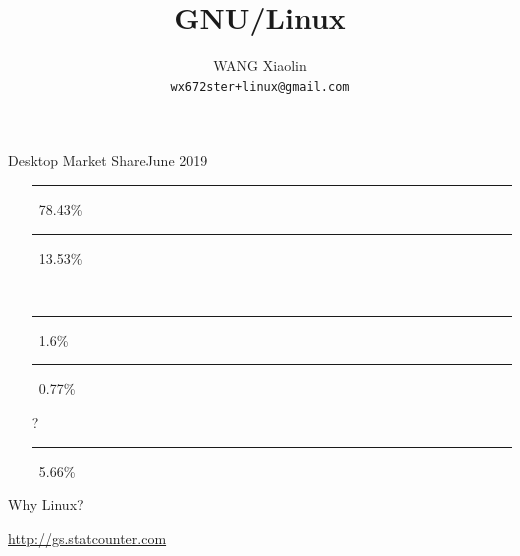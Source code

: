 \usepackage{worldflags}
\newcommand{\GG}{\textcolor{SkyBlue}{\nerd }}
\newcommand{\world}{\textcolor{SkyBlue}{\nerd 🌎}}%
\newcommand{\linux}{{\nerd }}
\newcommand{\openbook}{{\nerd }}

\title{GNU/Linux}

\author{WANG Xiaolin\\%
  {\footnotesize\texttt{wx672ster+linux@gmail.com}}}




\frame{\titlepage}

\begin{frame}{Desktop Market Share}{June 2019}
  \begin{itemize}
  \item[\win] \textcolor{SkyBlue}{\rule{.7843\textwidth}{2mm}}\,
    78.43\%    
  \item[\apple] \textcolor{LightGray}{\rule{.1353\textwidth}{2mm}}\,
    13.53\%
  \item[\linux] \rule{.016\textwidth}{2mm}\, 1.6\%
  \item[\chrome] \textcolor{Orange}{\rule{.0077\textwidth}{2mm}}\,
    0.77\%
  \item[?] \textcolor{Green}{\rule{.0566\textwidth}{2mm}}\, 5.66\%
  \end{itemize}

  \begin{center}
    \Huge\purisa Why Linux?
  \end{center}
  \vfill
  \begin{flushright}
    \scriptsize \url{http://gs.statcounter.com}
  \end{flushright}
\end{frame}

